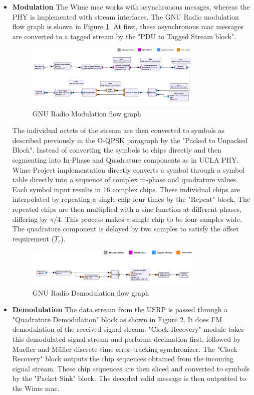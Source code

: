 \begin{itemize}

\item{\textbf{Modulation} The Wime \ac{mac} works with asynchronous mesages, whereas the \ac{PHY} is implemented with stream interfaces.
The GNU Radio modulation flow graph is shown in Figure \ref{TX flow graph}.
At first, these asynchronous \ac{mac} messages are converted to a tagged stream by the "PDU to Tagged Stream block".
\begin{figure}[h!]
\centering
\includegraphics[width=0.8\textwidth]{Figure/TXPath.png}
\caption{GNU Radio Modulation flow graph}
\label{TX flow graph}
\end{figure}

The individual octets of the stream are then converted to symbols as described previously in the \ac{O-QPSK} paragraph by the "Packed to Unpacked Block".
Instead of converting the symbols to chips directly and then segmenting into In-Phase and Quadrature components as in UCLA PHY.
Wime Project implementation directly converts a symbol through a symbol table directly into a sequence of complex in-phase and quadrature values.
Each symbol input results in 16 complex chips.
These individual chips are interpolated by repeating a single chip four times by the "Repeat" block.
The repeated chips are then multiplied with a sine function at different phases, differing by $\pi/4$.
This process makes a single chip to be four samples wide.
The quadrature component is delayed by two samples to satisfy the offset requirement ($T_c$).}

\begin{figure}[h!]
\centering
\includegraphics[width=0.8\textwidth]{Figure/RXPath.png}
\caption{GNU Radio Demodulation flow graph}
\label{RX flow graph}
\end{figure}


\item{\textbf{Demodulation} The data stream from the USRP is passed through a "Quadrature Demodulation" block as shown in Figure \ref{RX flow graph}.
It does FM demodulation of the received signal stream.
"Clock Recovery" module takes this demodulated signal stream and performs  decimation first, followed by  Mueller and Müller discrete-time error-tracking synchronizer.
The "Clock Recovery" block outputs the chip sequences obtained from the incoming signal stream.
These chip sequences are then sliced and converted to symbols by the "Packet Sink" block.
The decoded valid message is then outputted to the Wime \ac{mac}.}


\end{itemize}
